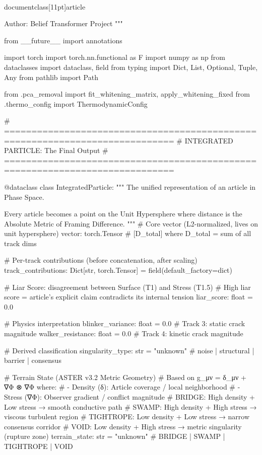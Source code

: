 \\documentclass[11pt]{article}
\begin{document}
\begin{CodeBlock}
Author: Belief Transformer Project
"""

from __future__ import annotations

import torch
import torch.nn.functional as F
import numpy as np
from dataclasses import dataclass, field
from typing import Dict, List, Optional, Tuple, Any
from pathlib import Path

from .pca_removal import fit_whitening_matrix, apply_whitening_fixed
from .thermo_config import ThermodynamicConfig


# =============================================================================
# INTEGRATED PARTICLE: The Final Output
# =============================================================================

@dataclass
class IntegratedParticle:
    """
    The unified representation of an article in Phase Space.

    Every article becomes a point on the Unit Hypersphere where distance
    is the Absolute Metric of Framing Difference.
    """
    # Core vector (L2-normalized, lives on unit hypersphere)
    vector: torch.Tensor  # [D_total] where D_total = sum of all track dims

    # Per-track contributions (before concatenation, after scaling)
    track_contributions: Dict[str, torch.Tensor] = field(default_factory=dict)

    # Liar Score: disagreement between Surface (T1) and Stress (T1.5)
    # High liar score = article's explicit claim contradicts its internal tension
    liar_score: float = 0.0

    # Physics interpretation
    blinker_variance: float = 0.0   # Track 3: static crack magnitude
    walker_resistance: float = 0.0  # Track 4: kinetic crack magnitude

    # Derived classification
    singularity_type: str = "unknown"  # noise | structural | barrier | consensus

    # Terrain State (ASTER v3.2 Metric Geometry)
    # Based on g_μν = δ_μν + ∇Φ ⊗ ∇Φ where:
    #   - Density (δ): Article coverage / local neighborhood
    #   - Stress (∇Φ): Observer gradient / conflict magnitude
    # BRIDGE: High density + Low stress → smooth conductive path
    # SWAMP: High density + High stress → viscous turbulent region
    # TIGHTROPE: Low density + Low stress → narrow consensus corridor
    # VOID: Low density + High stress → metric singularity (rupture zone)
    terrain_state: str = "unknown"  # BRIDGE | SWAMP | TIGHTROPE | VOID


\end{CodeBlock}
\end{document}
